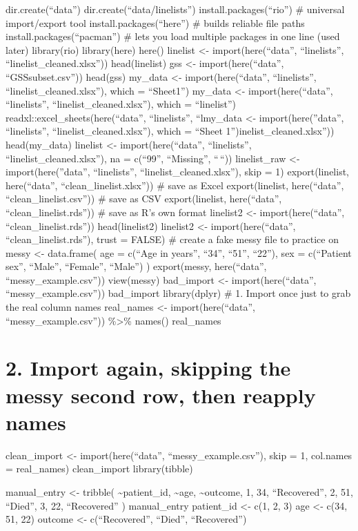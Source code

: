\documentclass[
]{article}
\begin{document}
dir.create(``data'') dir.create(``data/linelists'')
install.packages(``rio'') \# universal import/export tool
install.packages(``here'') \# builds reliable file paths
install.packages(``pacman'') \# lets you load multiple packages in one
line (used later) library(rio) library(here) here() linelist \textless-
import(here(``data'', ``linelists'', ``linelist\_cleaned.xlsx''))
head(linelist) gss \textless- import(here(``data'', ``GSSsubset.csv''))
head(gss) my\_data \textless- import(here(``data'', ``linelists'',
``linelist\_cleaned.xlsx''), which = ``Sheet1'') my\_data \textless-
import(here(``data'', ``linelists'', ``linelist\_cleaned.xlsx''), which
= ``linelist'') readxl::excel\_sheets(here(``data'', ``linelists'',
``lmy\_data \textless- import(here(''data'', ``linelists'',
``linelist\_cleaned.xlsx''), which = ``Sheet
1'')inelist\_cleaned.xlsx'')) head(my\_data) linelist \textless-
import(here(``data'', ``linelists'', ``linelist\_cleaned.xlsx''), na =
c(``99'', ``Missing'', ``\,``)) linelist\_raw \textless-
import(here(''data'', ``linelists'', ``linelist\_cleaned.xlsx''), skip =
1) export(linelist, here(``data'', ``clean\_linelist.xlsx'')) \# save as
Excel export(linelist, here(``data'', ``clean\_linelist.csv'')) \# save
as CSV export(linelist, here(``data'', ``clean\_linelist.rds'')) \# save
as R's own format linelist2 \textless- import(here(``data'',
``clean\_linelist.rds'')) head(linelist2) linelist2 \textless-
import(here(``data'', ``clean\_linelist.rds''), trust = FALSE) \# create
a fake messy file to practice on messy \textless- data.frame( age =
c(``Age in years'', ``34'', ``51'', ``22''), sex = c(``Patient sex'',
``Male'', ``Female'', ``Male'') ) export(messy, here(``data'',
``messy\_example.csv'')) view(messy) bad\_import \textless-
import(here(``data'', ``messy\_example.csv'')) bad\_import
library(dplyr) \# 1. Import once just to grab the real column names
real\_names \textless- import(here(``data'', ``messy\_example.csv''))
\%\textgreater\% names() real\_names

\section{2. Import again, skipping the messy second row, then reapply
names}\label{import-again-skipping-the-messy-second-row-then-reapply-names}

clean\_import \textless- import(here(``data'', ``messy\_example.csv''),
skip = 1, col.names = real\_names) clean\_import library(tibble)

manual\_entry \textless- tribble( \textasciitilde patient\_id,
\textasciitilde age, \textasciitilde outcome, 1, 34, ``Recovered'', 2,
51, ``Died'', 3, 22, ``Recovered'' ) manual\_entry patient\_id
\textless- c(1, 2, 3) age \textless- c(34, 51, 22) outcome \textless-
c(``Recovered'', ``Died'', ``Recovered'')
\end{document}
